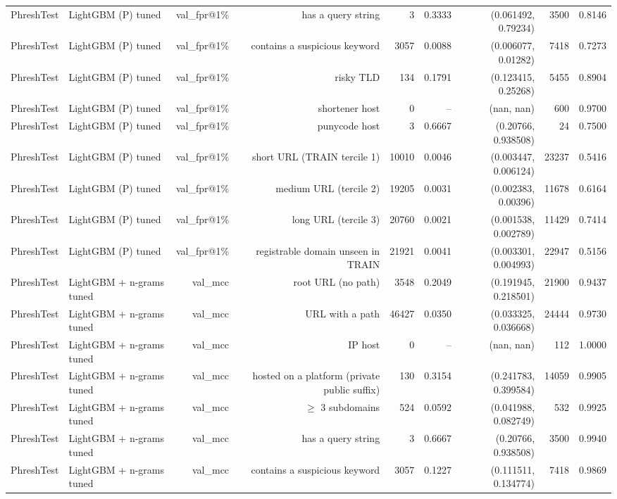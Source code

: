 \begin{table}[t]
\begin{tabular}{llrrrrrrr}
PhreshTest & LightGBM (P) tuned & val\_fpr@1\% & has a query string & 3 & 0.3333 & (0.061492, 0.79234) & 3500 & 0.8146 \\
PhreshTest & LightGBM (P) tuned & val\_fpr@1\% & contains a suspicious keyword & 3057 & 0.0088 & (0.006077, 0.01282) & 7418 & 0.7273 \\
PhreshTest & LightGBM (P) tuned & val\_fpr@1\% & risky TLD & 134 & 0.1791 & (0.123415, 0.25268) & 5455 & 0.8904 \\
PhreshTest & LightGBM (P) tuned & val\_fpr@1\% & shortener host & 0 & -- & (nan, nan) & 600 & 0.9700 \\
PhreshTest & LightGBM (P) tuned & val\_fpr@1\% & punycode host & 3 & 0.6667 & (0.20766, 0.938508) & 24 & 0.7500 \\
PhreshTest & LightGBM (P) tuned & val\_fpr@1\% & short URL (TRAIN tercile 1) & 10010 & 0.0046 & (0.003447, 0.006124) & 23237 & 0.5416 \\
PhreshTest & LightGBM (P) tuned & val\_fpr@1\% & medium URL (tercile 2) & 19205 & 0.0031 & (0.002383, 0.00396) & 11678 & 0.6164 \\
PhreshTest & LightGBM (P) tuned & val\_fpr@1\% & long URL (tercile 3) & 20760 & 0.0021 & (0.001538, 0.002789) & 11429 & 0.7414 \\
PhreshTest & LightGBM (P) tuned & val\_fpr@1\% & registrable domain unseen in TRAIN & 21921 & 0.0041 & (0.003301, 0.004993) & 22947 & 0.5156 \\
PhreshTest & LightGBM + n-grams tuned & val\_mcc & root URL (no path) & 3548 & 0.2049 & (0.191945, 0.218501) & 21900 & 0.9437 \\
PhreshTest & LightGBM + n-grams tuned & val\_mcc & URL with a path & 46427 & 0.0350 & (0.033325, 0.036668) & 24444 & 0.9730 \\
PhreshTest & LightGBM + n-grams tuned & val\_mcc & IP host & 0 & -- & (nan, nan) & 112 & 1.0000 \\
PhreshTest & LightGBM + n-grams tuned & val\_mcc & hosted on a platform (private public suffix) & 130 & 0.3154 & (0.241783, 0.399584) & 14059 & 0.9905 \\
PhreshTest & LightGBM + n-grams tuned & val\_mcc & $\geq$ 3 subdomains & 524 & 0.0592 & (0.041988, 0.082749) & 532 & 0.9925 \\
PhreshTest & LightGBM + n-grams tuned & val\_mcc & has a query string & 3 & 0.6667 & (0.20766, 0.938508) & 3500 & 0.9940 \\
PhreshTest & LightGBM + n-grams tuned & val\_mcc & contains a suspicious keyword & 3057 & 0.1227 & (0.111511, 0.134774) & 7418 & 0.9869 \\

\end{tabular}
\end{table}
